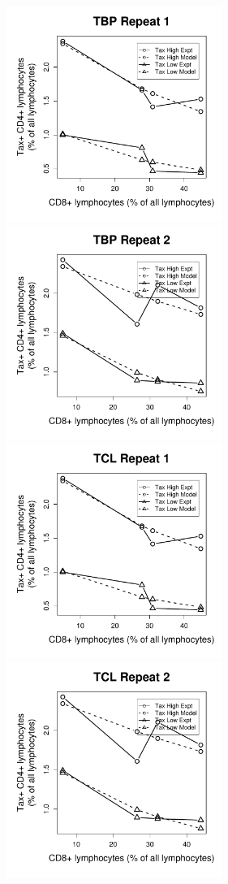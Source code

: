 \begin{figure}[htp]
\centering
\includegraphics[width=7cm]{./Figures/chapter5/figure_lysis_tbp_rep_1}%
\hspace{0cm}%
\includegraphics[width=7cm]{./Figures/chapter5/figure_lysis_tbp_rep_2} \\
\includegraphics[width=7cm]{./Figures/chapter5/figure_lysis_tcl_rep_1}%
\hspace{0cm}%
\includegraphics[width=7cm]{./Figures/chapter5/figure_lysis_tcl_rep_2} \\

\end{figure}
